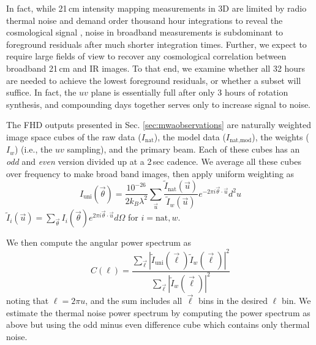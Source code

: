 \documentclass{emulateapj}
\begin{document}
In fact, while 21\,cm intensity mapping measurements in 3D are limited by radio thermal noise and demand order thousand hour integrations to reveal the cosmological signal \citep{beardsley13,PoberNextGen}, noise in broadband measurements is subdominant to foreground residuals after much shorter integration times. Further, we expect to require large fields of view to recover any cosmological correlation between broadband 21\,cm and IR images. To that end, we examine whether all 32 hours are needed to achieve the lowest foreground residuals, or whether a subset will suffice. In fact, the $uv$ plane is essentially full after only 3 hours of rotation synthesis, and compounding days together serves only to increase signal to noise. 

The FHD outputs presented in Sec. \ref{sec:mwaobservations} are naturally weighted image space cubes of the raw data ($I_\text{nat}$), the model data ($I_\text{nat,mod}$), the weights ($I_w$) (i.e., the $uv$ sampling), and the primary beam. Each of these cubes has an \textit{odd} and \textit{even} version divided up at a 2\,sec cadence. We average all these cubes over frequency to make broad band images, then apply uniform weighting as
\begin{equation}
\label{eqn:uniformweighting}
I_\text{uni}(\vec{\theta}) = \frac{10^{-26}}{2k_B \lambda^2} \sum_{\vec{u}} \frac{\tilde{I}_\text{nat}(\vec{u})}{\tilde{I}_w(\vec{u})} e^{-2\pi i \vec{\theta}\cdot\vec{u}}d^2u
\end{equation}
$\tilde{I}_i(\vec{u}) = \sum_{\vec{\theta}} I_i(\vec{\theta}) e^{2\pi i\vec{\theta}\cdot\vec{u}} d\Omega$ for $i=\text{nat},w$.

We then compute the angular power spectrum as
\begin{equation}
	C(\ell)=\frac{\sum_{\vec{\ell}}|\tilde{I}_\text{uni}(\vec{\ell})\tilde{I}_w(\vec{\ell})|^2}{\sum_{\vec{\ell}}|\tilde{I}_w(\vec{\ell})|^2}
\end{equation}
noting that $\ell=2\pi u$, and the sum includes all $\vec{\ell}$ bins in the desired $\ell$ bin.  We estimate the thermal noise power spectrum by computing the power spectrum as above but using the odd minus even difference cube which contains only thermal noise.
\end{document}
